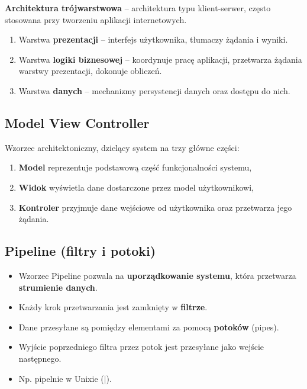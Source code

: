 \documentclass[main.tex]{subfiles}
\begin{document}
    \noindent \textbf{Architektura trójwarstwowa} -- architektura typu klient-serwer,
    często stosowana przy tworzeniu aplikacji internetowych.
    \begin{enumerate}[noitemsep]
        \item Warstwa \textbf{prezentacji} -- interfejs użytkownika, tłumaczy żądania i wyniki.
        \item Warstwa \textbf{logiki biznesowej} -- koordynuje pracę aplikacji, przetwarza żądania
        warstwy prezentacji, dokonuje obliczeń.
        \item Warstwa \textbf{danych} -- mechanizmy persystencji danych oraz dostępu do nich.
    \end{enumerate}

    \subsection{Model View Controller}

    Wzorzec architektoniczny, dzielący system na trzy główne części:
    \begin{enumerate}[noitemsep]
        \item \textbf{Model} reprezentuje podstawową część funkcjonalności systemu,
        \item \textbf{Widok} wyświetla dane dostarczone przez model użytkownikowi,
        \item \textbf{Kontroler} przyjmuje dane wejściowe od użytkownika oraz przetwarza jego żądania.
    \end{enumerate}

    \subsection{Pipeline (filtry i potoki)}
    \begin{itemize}[noitemsep]
        \item  Wzorzec Pipeline pozwala na \textbf{uporządkowanie systemu}, która przetwarza
        \textbf{strumienie danych}.
        \item  Każdy krok przetwarzania jest zamknięty w \textbf{filtrze}.
        \item  Dane przesyłane są pomiędzy elementami za pomocą \textbf{potoków} (pipes).
        \item Wyjście poprzedniego filtra przez potok jest przesyłane jako wejście następnego.
        \item Np. pipelnie w Unixie ($|$).
    \end{itemize}
\end{document}
